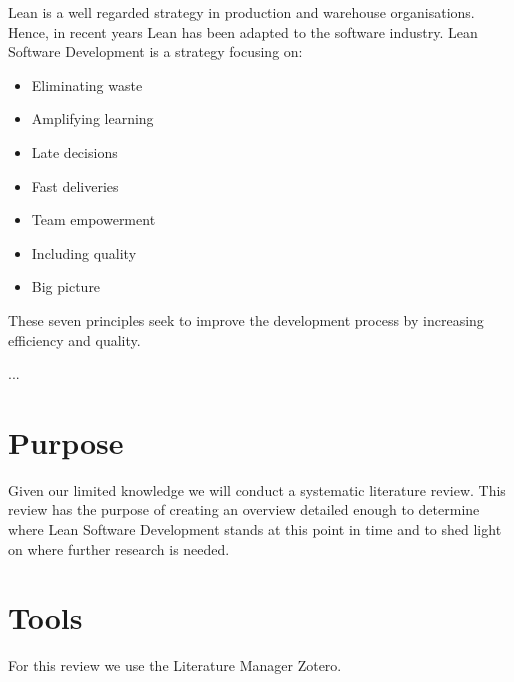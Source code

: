 Lean is a well regarded strategy in production and warehouse organisations. Hence, in recent years Lean has been adapted to the software industry. 
Lean Software Development is a strategy focusing on: 
\begin{itemize}
	\item Eliminating waste
	\item Amplifying learning
	\item Late decisions
	\item Fast deliveries
	\item Team empowerment
	\item Including quality
	\item Big picture
\end{itemize}
These seven principles seek to improve the development process by increasing efficiency and quality.

...

\section{Purpose}
Given our limited knowledge we will conduct a systematic literature review.
This review has the purpose of creating an overview detailed enough to determine where Lean Software Development stands at this point in time and to shed light on where further research is needed. 



\section{Tools}
For this review we use the Literature Manager Zotero.